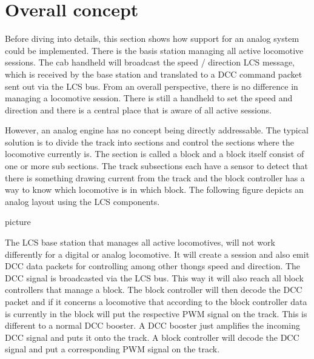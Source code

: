 \section{Overall concept}

Before diving into details, this section shows how support for an analog system could be implemented. There is the basis station managing all active locomotive sessions. The cab handheld will broadcast the speed / direction LCS message, which is received by the base station and translated to a DCC command packet sent out via the LCS bus. From an overall perspective, there is no difference in managing a locomotive session. There is still a handheld to set the speed and direction and there is a central place that is aware of all active sessions.

However, an analog engine has no concept being directly addressable. The typical solution is to divide the track into sections and control the sections where the locomotive currently is. The section is called a block and a block itself consist of one or more sub sections. The track subsections each have a sensor to detect that there is something drawing current from the track and the block controller has a way to know which locomotive is in which block. The following figure depicts an analog layout using the LCS components.

picture 

\begin{figure}[!ht]
    \centering
\end{figure}

The LCS base station that manages all active locomotives, will not work differently for a digital or analog locomotive. It will create a session and also emit DCC data packets for controlling among other thongs speed and direction. The DCC signal is broadcasted via the LCS bus. This way it will also reach all block controllers that manage a block. The block controller will then decode the DCC packet and if it concerns a locomotive that according to the block controller data is currently in the block will put the respective PWM signal on the track. This is different to a normal DCC booster. A DCC booster just amplifies the incoming DCC signal and puts it onto the track. A block controller will decode the DCC signal and put a corresponding PWM signal on the track.

